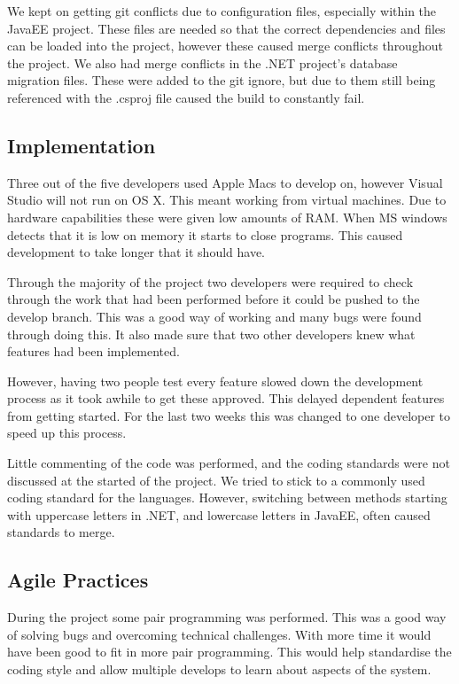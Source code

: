 We kept on getting git conflicts due to configuration files, especially within the JavaEE project. These files are needed so that the correct dependencies and files can be loaded into the project, however these caused merge conflicts throughout the project. We also had merge conflicts in the .NET project's database migration files. These were added to the git ignore, but due to them still being referenced with the .csproj file caused the build to constantly fail.

\subsection{Implementation}

Three out of the five developers used Apple Macs to develop on, however Visual Studio will not run on OS X. This meant working from virtual machines.  Due to hardware capabilities these were given low amounts of RAM. When MS windows detects that it is low on memory it starts to close programs. This caused development to take longer that it should have.

Through the majority of the project two developers were required to check through the work that had been performed before it could be pushed to the develop branch. This was a good way of working and many bugs were found through doing this. It also made sure that two other developers knew what features had been implemented.

However, having two people test every feature slowed down the development process as it took awhile to get these approved. This delayed dependent features from getting started. For the last two weeks this was changed to one developer to speed up this process.

Little commenting of the code was performed, and the coding standards were not discussed at the started of the project. We tried to stick to a commonly used coding standard for the languages. However, switching between methods starting with uppercase letters in .NET, and lowercase letters in JavaEE, often caused standards to merge.

\subsection{Agile Practices}

During the project some pair programming was performed. This was a good way of solving bugs and overcoming technical challenges. With more time it would have been good to fit in more pair programming. This would help standardise the coding style and allow multiple develops to learn about aspects of the system.

